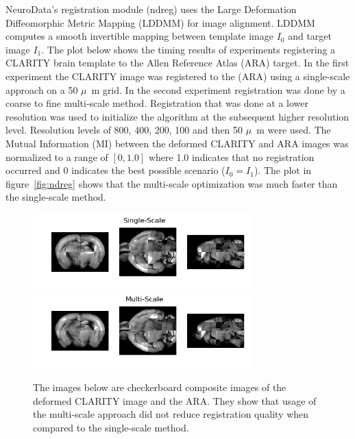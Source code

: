 \documentclass[simplex.tex]{subfiles}
\begin{document}
NeuroData’s registration module (ndreg) uses the Large Deformation
Diffeomorphic Metric Mapping (LDDMM) for image alignment.  LDDMM
computes a smooth invertible mapping between template image $I_0$ and
target image $I_1$. The plot below shows the timing results of experiments
registering a CLARITY brain template to the Allen Reference Atlas (ARA)
target.  In the first experiment the CLARITY image was registered to the
(ARA) using a single-scale approach on a 50 $\mu$~m grid.  In the second
experiment registration was done by a coarse to fine multi-scale method.
Registration that was done at a lower resolution was used to initialize
the algorithm at the subsequent higher resolution level.  Resolution
levels of 800, 400, 200, 100 and then 50 $\mu$~m were used. The Mutual
Information (MI) between the deformed CLARITY and ARA images was
normalized to a range of $[0, 1.0]$ where 1.0 indicates that no
registration occurred and 0 indicates the best possible scenario ($I_0 =
I_1$).  The plot in figure~\ref{fig:ndreg} shows that the multi-scale optimization was much faster
than the single-scale method.


\begin{figure}[h!]
\begin{cframed}
\centering
\includegraphics[width=0.75\textwidth]{../../figs/ndreg-single.png}
\includegraphics[width=0.75\textwidth]{../../figs/ndreg-multiscale.png}
\caption{
  The images below are checkerboard composite images of the deformed
  CLARITY image and the ARA.  They show that usage of the multi-scale
  approach did not reduce registration quality when compared to the
  single-scale method.
}
\label{fig:ndregChecker}
\end{cframed}
\end{figure}
\end{document}
